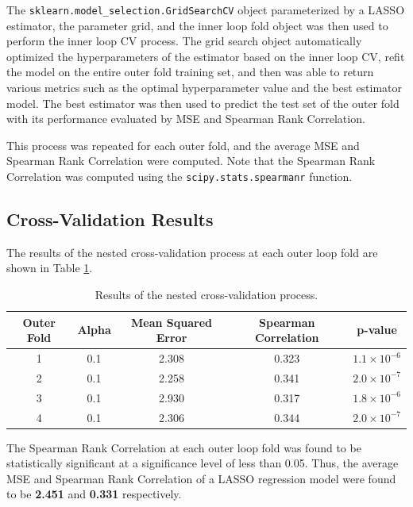 \documentclass[11pt]{article}
\begin{document}
The \verb|sklearn.model_selection.GridSearchCV| object parameterized by a LASSO estimator, the parameter grid, and the inner loop fold object was then used to perform the inner loop CV process. The grid search object automatically optimized the hyperparameters of the estimator based on the inner loop CV, refit the model on the entire outer fold training set, and then was able to return various metrics such as the optimal hyperparameter value and the best estimator model. The best estimator was then used to predict the test set of the outer fold with its performance evaluated by MSE and Spearman Rank Correlation. 

This process was repeated for each outer fold, and the average MSE and Spearman Rank Correlation were computed. Note that the Spearman Rank Correlation was computed using the \verb|scipy.stats.spearmanr| function.

\subsection{Cross-Validation Results}
The results of the nested cross-validation process at each outer loop fold are shown in Table \ref{tab:regression_results}.

\begin{table}[H]
    \centering
    \begin{tabular}{|c|c|c|c|c|}
        \hline
        Outer Fold & Alpha & Mean Squared Error & Spearman Correlation & p-value \\
        \hline
        1 & 0.1 & 2.308 & 0.323 & $1.1 \times 10^{-6}$ \\
        2 & 0.1 & 2.258 & 0.341 & $2.0 \times 10^{-7}$ \\
        3 & 0.1 & 2.930 & 0.317 & $1.8 \times 10^{-6}$ \\
        4 & 0.1 & 2.306 & 0.344 & $2.0 \times 10^{-7}$ \\
        \hline
    \end{tabular}
    \caption{Results of the nested cross-validation process.}
    \label{tab:regression_results}
\end{table}

\vspace{-0.5cm}

The Spearman Rank Correlation at each outer loop fold was found to be statistically significant at a significance level of less than 0.05. Thus, the average MSE and Spearman Rank Correlation of a LASSO regression model were found to be \textbf{2.451} and \textbf{0.331} respectively.
\end{document}
